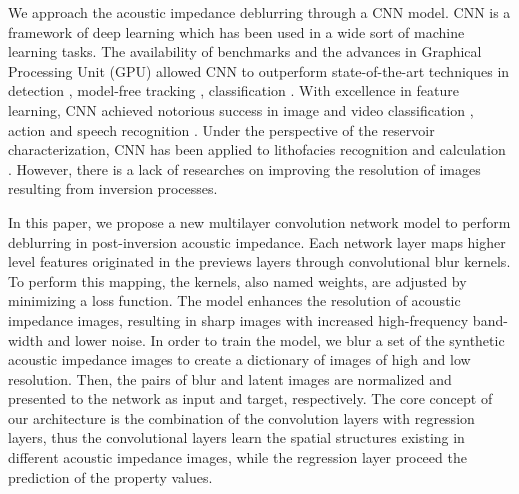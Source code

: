 \documentclass[conference]{IEEEtran}
\begin{document}
We approach  the acoustic impedance deblurring through
a CNN model. CNN is a framework of deep learning which has been
used in a wide sort of machine learning tasks. The availability of benchmarks
\cite{Russakovsky} and the advances in Graphical Processing Unit (GPU) \cite{Buduma15}
allowed CNN to outperform state-of-the-art techniques in detection \cite{Girshick2015,Bell2015}, model-free
tracking \cite{Nam}, classification \cite{He2016}. With excellence in feature learning,
CNN achieved notorious success in image and video classification \cite{Krizhevsky2012, AbdelHamid2014}, action  and speech recognition \cite{Farfade2015, S_Ji2013}.
Under the perspective of the reservoir characterization, CNN has been applied to lithofacies recognition
\cite{Qian} and calculation \cite{Liu2017}. However, there is a lack of researches on improving the resolution of
images resulting from inversion processes.

In this paper, we propose a new multilayer convolution network model to perform deblurring in post-inversion acoustic impedance.
Each network layer maps higher level features originated in the previews layers through convolutional blur kernels.
To perform this mapping, the kernels, also named weights, are adjusted by minimizing a loss function. 
The model enhances the resolution of acoustic impedance images, resulting in sharp images with
increased high-frequency band-width and lower noise. 
In order to train the model, we blur a set of the synthetic acoustic impedance images to create a dictionary of
images of high and low resolution. Then, the pairs of blur and latent images are normalized and 
presented to the network as input and target, respectively.
The core concept of our architecture is the combination of the convolution layers with regression
layers, thus the convolutional layers learn the spatial structures existing in different
acoustic impedance images, while the regression layer proceed the prediction of the property values.
\end{document}
